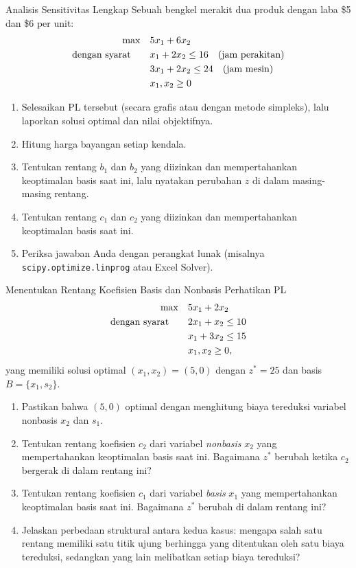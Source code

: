 \begin{ex}{Analisis Sensitivitas Lengkap}{}
\label{ex:sensitivity-workup-2x2}
 Sebuah bengkel merakit dua produk dengan laba \$5 dan \$6 per unit:
\[
\begin{aligned}
\max \quad & 5x_1 + 6x_2 \\
\mbox{dengan syarat}\quad \quad
& x_1 + 2x_2 \leq 16 \quad \mbox{(jam perakitan)} \\
& 3x_1 + 2x_2 \leq 24 \quad \mbox{(jam mesin)} \\
& x_1, x_2 \geq 0
\end{aligned}
\]
\begin{enumerate}
\item Selesaikan PL tersebut (secara grafis atau dengan metode simpleks), lalu laporkan solusi optimal dan nilai objektifnya.
\item Hitung harga bayangan setiap kendala.
\item Tentukan rentang $b_1$ dan $b_2$ yang diizinkan dan mempertahankan keoptimalan basis saat ini, lalu nyatakan perubahan $z$ di dalam masing-masing rentang.
\item Tentukan rentang $c_1$ dan $c_2$ yang diizinkan dan mempertahankan keoptimalan basis saat ini.
\item Periksa jawaban Anda dengan perangkat lunak (misalnya \texttt{scipy.optimize.linprog} atau Excel Solver).
\end{enumerate}
\exrefs{\S\ref{sec:sensitivity-rhs}, \S\ref{sec:sensitivity-cost}, \S\ref{sec:sensitivity-matrix}}
\end{ex}

\begin{ex}{Menentukan Rentang Koefisien Basis dan Nonbasis}{}
\label{ex:sensitivity-obj-nonbasic}
 Perhatikan PL
\[
\begin{aligned}
\max \quad & 5x_1 + 2x_2 \\
\mbox{dengan syarat}\quad \quad
& 2x_1 + x_2 \leq 10 \\
& x_1 + 3x_2 \leq 15 \\
& x_1, x_2 \geq 0,
\end{aligned}
\]
yang memiliki solusi optimal $(x_1, x_2) = (5, 0)$ dengan $z^* = 25$ dan basis $B = \{x_1, s_2\}$.
\begin{enumerate}
\item Pastikan bahwa $(5,0)$ optimal dengan menghitung biaya tereduksi variabel nonbasis $x_2$ dan $s_1$.
\item Tentukan rentang koefisien $c_2$ dari variabel \emph{nonbasis} $x_2$ yang mempertahankan keoptimalan basis saat ini. Bagaimana $z^*$ berubah ketika $c_2$ bergerak di dalam rentang ini?
\item Tentukan rentang koefisien $c_1$ dari variabel \emph{basis} $x_1$ yang mempertahankan keoptimalan basis saat ini. Bagaimana $z^*$ berubah di dalam rentang ini?
\item Jelaskan perbedaan struktural antara kedua kasus: mengapa salah satu rentang memiliki satu titik ujung berhingga yang ditentukan oleh satu biaya tereduksi, sedangkan yang lain melibatkan setiap biaya tereduksi?
\end{enumerate}
\exrefs{\S\ref{sec:sensitivity-cost}, \S\ref{sec:sensitivity-overview}}
\end{ex}

